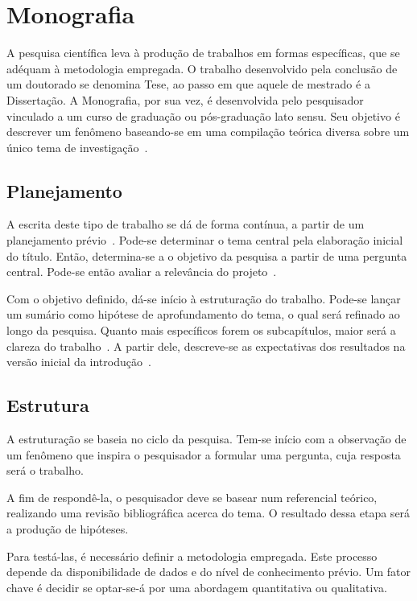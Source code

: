 \section{Monografia}%
\label{sec:monografia}

A pesquisa científica leva à produção de trabalhos em formas específicas, que se adéquam à metodologia empregada.
O trabalho desenvolvido pela conclusão de um doutorado se denomina Tese, ao passo em que aquele de mestrado é a Dissertação.
A Monografia, por sua vez, é desenvolvida pelo pesquisador vinculado a um curso de graduação ou pós-graduação lato sensu.
Seu objetivo é descrever um fenômeno baseando-se em uma compilação teórica diversa sobre um único tema de investigação~\cite{dias_2009_como_escrever}.

\subsection{Planejamento}

A escrita deste tipo de trabalho se dá de forma contínua, a partir de um planejamento prévio~\cite{maillard_2010_escrever_monografias}.
Pode-se determinar o tema central pela elaboração inicial do título.
Então, determina-se a o objetivo da pesquisa a partir de uma pergunta central.
Pode-se então avaliar a relevância do projeto~\cite{dias_2009_como_escrever}.

Com o objetivo definido, dá-se início à estruturação do trabalho.
Pode-se lançar um sumário como hipótese de aprofundamento do tema, o qual será refinado ao longo da pesquisa.
Quanto mais específicos forem os subcapítulos, maior será a clareza do trabalho~\cite{maillard_2010_escrever_monografias}.
A partir dele, descreve-se as expectativas dos resultados na versão inicial da introdução~\cite{dias_2009_como_escrever}.

\subsection{Estrutura}

A estruturação se baseia no ciclo da pesquisa.
Tem-se início com a observação de um fenômeno que inspira o pesquisador a formular uma pergunta, cuja resposta será o trabalho.

A fim de respondê-la, o pesquisador deve se basear num referencial teórico, realizando uma revisão bibliográfica acerca do tema.
O resultado dessa etapa será a produção de hipóteses.

Para testá-las, é necessário definir a metodologia empregada.
Este processo depende da disponibilidade de dados e do nível de conhecimento prévio.
Um fator chave é decidir se optar-se-á por uma abordagem quantitativa ou qualitativa.

